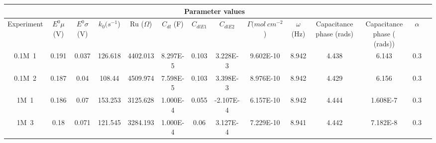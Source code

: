 \documentclass[preview]{standalone}
\begin{document}
\begin{center}
\begin{tabular}{|c|c|c|c|c|c|c|c|c|c|c|c|c|c|}
\hline
\multicolumn{13}{|c|}{Parameter values}\\ 
\hline
Experiment & $E^0 \mu$ (V) & $E^0 \sigma$ (V) & $k_0 (s^{-1}$) & Ru ($\Omega$) & $C_{dl}$ (F) & $C_{dlE1}$ & $C_{dlE2}$ & $\Gamma (mol\:cm^{-2}$) & $\omega$ (Hz) & Capacitance phase (rads) & Capacitance phase ( (rads)) & $\alpha$\\
\hline
0.1M\ 1 & 0.191 & 0.037 & 126.618 & 4402.013 & 8.297E-5 & 0.103 & 3.228E-3 & 9.602E-10 & 8.942 & 4.438 & 6.143 & 0.3\\
\hline
0.1M\ 2 & 0.187 & 0.04 & 108.44 & 4509.974 & 7.598E-5 & 0.103 & 3.398E-3 & 8.976E-10 & 8.942 & 4.429 & 6.156 & 0.3\\
\hline
1M\ 1 & 0.186 & 0.07 & 153.253 & 3125.628 & 1.000E-4 & 0.055 & -2.107E-4 & 6.157E-10 & 8.942 & 4.444 & 1.608E-7 & 0.3\\
\hline
1M\ 3 & 0.18 & 0.071 & 121.545 & 3284.193 & 1.000E-4 & 0.06 & 3.127E-4 & 7.229E-10 & 8.941 & 4.442 & 7.182E-8 & 0.3\\
\hline
\end{tabular}
\end{center}
\end{document}
